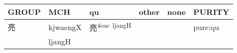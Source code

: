 \documentclass[14pt,a4paper]{scrartcl}
\begin{document}
\begin{longtable}[c]{@{}llllll@{}}
\toprule
\begin{minipage}[b]{0.14\columnwidth}\raggedright\strut
GROUP
\strut\end{minipage} &
\begin{minipage}[b]{0.14\columnwidth}\raggedright\strut
MCH
\strut\end{minipage} &
\begin{minipage}[b]{0.14\columnwidth}\raggedright\strut
qu
\strut\end{minipage} &
\begin{minipage}[b]{0.14\columnwidth}\raggedright\strut
other
\strut\end{minipage} &
\begin{minipage}[b]{0.14\columnwidth}\raggedright\strut
none
\strut\end{minipage} &
\begin{minipage}[b]{0.14\columnwidth}\raggedright\strut
PURITY
\strut\end{minipage}\tabularnewline
\midrule
\endhead
\begin{minipage}[t]{0.14\columnwidth}\raggedright\strut
亮
\strut\end{minipage} &
\begin{minipage}[t]{0.14\columnwidth}\raggedright\strut
kjwaengX
\strut\end{minipage} &
\begin{minipage}[t]{0.14\columnwidth}\raggedright\strut
亮\textsuperscript{4eae~ljangH}
\strut\end{minipage} &
\begin{minipage}[t]{0.14\columnwidth}\raggedright\strut
\strut\end{minipage} &
\begin{minipage}[t]{0.14\columnwidth}\raggedright\strut
\strut\end{minipage} &
\begin{minipage}[t]{0.14\columnwidth}\raggedright\strut
pure:qu
\strut\end{minipage}\tabularnewline
\begin{minipage}[t]{0.14\columnwidth}\raggedright\strut
𢂋
\strut\end{minipage} &
\begin{minipage}[t]{0.14\columnwidth}\raggedright\strut
ljangH
\strut\end{minipage} &
\begin{minipage}[t]{0.14\columnwidth}\raggedright\strut
\strut\end{minipage} &

\end{longtable}
\end{document}
